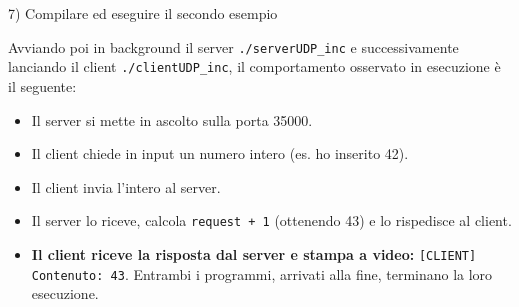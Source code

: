 \documentclass[11pt]{article}
\begin{document}
\begin{tcolorbox}[colback=blue!5!white,colframe=blue!75!black,title=\textbf{DOMANDA}, breakable]
7) Compilare ed eseguire il secondo esempio
\end{tcolorbox}

\begin{tcolorbox}[colback=green!5!white,colframe=green!75!black,title=\textbf{RISPOSTA}, breakable]
Avviando poi in background il server \texttt{./serverUDP\_inc} e successivamente lanciando il client \texttt{./clientUDP\_inc}, il comportamento osservato in esecuzione è il seguente:

\begin{itemize}
    \item Il server si mette in ascolto sulla porta 35000.
    \item Il client chiede in input un numero intero (es. ho inserito 42).
    \item Il client invia l'intero al server.
    \item Il server lo riceve, calcola \texttt{request + 1} (ottenendo 43) e lo rispedisce al client.
    \item \textbf{Il client riceve la risposta dal server e stampa a video:} \texttt{[CLIENT] Contenuto: 43}. Entrambi i programmi, arrivati alla fine, terminano la loro esecuzione.
\end{itemize}
\end{tcolorbox}
\end{document}
